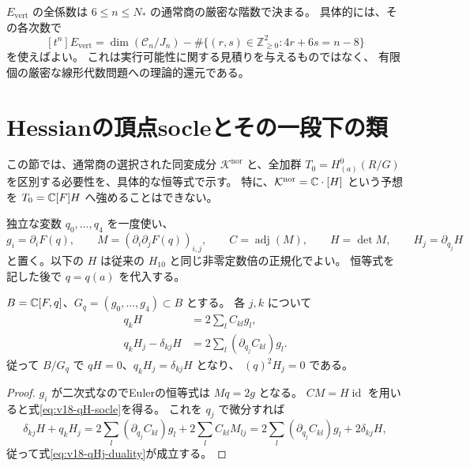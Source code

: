 \begin{corollary}[全通常商の残余の有限判定範囲]
\label{cor:v18-Evert-finite-decision}
$E_{\mathrm{vert}}$ の全係数は $6\le n\le N_*$ の通常商の厳密な階数で決まる。
具体的には、その各次数で
\[
 [t^n]E_{\mathrm{vert}}
 =\dim(\mathcal C_n/J_n)
 -\#\{(r,s)\in\mathbb Z_{\ge0}^2:4r+6s=n-8\}
\]
を使えばよい。
これは実行可能性に関する見積りを与えるものではなく、
有限個の厳密な線形代数問題への理論的還元である。
\end{corollary}





\section{Hessianの頂点socleとその一段下の類}
\label{sec:v18-vertex-hessian-chain}

この節では、通常商の選択された同変成分
$\mathcal K^{\mathrm{nor}}$ と、全加群
$T_0=H^0_{(a)}(R/G)$ を区別する必要性を、具体的な恒等式で示す。
特に、$\mathcal K^{\mathrm{nor}}=\mathbb C\cdot[H]$ という予想を
$T_0=\mathbb C[F]H$ へ強めることはできない。

独立な変数 $q_0,\ldots,q_4$ を一度使い、
\[
 g_i=\partial_iF(q),\qquad M=(\partial_i\partial_jF(q))_{i,j},
 \qquad C=\operatorname{adj}(M),\qquad H=\det M,
 \qquad H_j=\partial_{q_j}H
\]
と置く。以下の $H$ は従来の $H_{10}$ と同じ非零定数倍の正規化でよい。
恒等式を記した後で $q=q(a)$ を代入する。

\begin{lemma}[Hessianとその微分の乗法恒等式]
\label{lem:v18-hessian-derivative-identity}
$B=\mathbb C[F,q]$、$G_q=(g_0,\ldots,g_4)\subset B$ とする。
各 $j,k$ について
\begin{align}
 q_kH&=2\sum_l C_{kl}g_l,
 \label{eq:v18-qH-socle}\\
 q_kH_j-\delta_{kj}H
 &=2\sum_l (\partial_{q_j}C_{kl})g_l.
 \label{eq:v18-qHj-duality}
\end{align}
従って $B/G_q$ で $qH=0$、$q_kH_j=\delta_{kj}H$ となり、
$(q)^2H_j=0$ である。
\end{lemma}

\begin{proof}
$g_i$ が二次式なのでEulerの恒等式は $Mq=2g$ となる。
$CM=H\operatorname{id}$ を用いると式\eqref{eq:v18-qH-socle}を得る。
これを $q_j$ で微分すれば
\[
 \delta_{kj}H+q_kH_j
 =2\sum_l(\partial_{q_j}C_{kl})g_l
   +2\sum_l C_{kl}M_{lj}
 =2\sum_l(\partial_{q_j}C_{kl})g_l+2\delta_{kj}H,
\]
従って式\eqref{eq:v18-qHj-duality}が成立する。
\end{proof}

